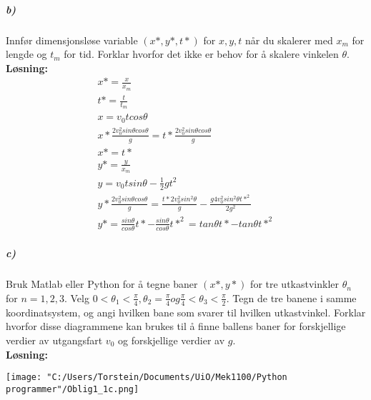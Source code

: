\documentclass[11pt, A4paper,norsk]{article}
\begin{document}
			\subparagraph{b)}
				\begin{flushleft}
Innfør dimensjonsløse variable $(x*, y* , t*)$ for $x, y, t$ når du skalerer med $x_m$ for lengde og $t_m$ for tid. Forklar hvorfor det ikke er behov for å skalere vinkelen $\theta$. \\
\vspace{1mm}
\textbf{Løsning:} \\
\vspace{1mm}
					\begin{align}
x* = \frac{x}{x_m} \nonumber \\
t* = \frac{t}{t_m} \nonumber \\
x = v_0 t cos\theta \nonumber \\
x* \frac{2 v_0^2 sin\theta cos\theta}{g} = t* \frac{2 v_0^2 sin\theta cos\theta}{g} \nonumber \\
x* = t* \nonumber \\
y* = \frac{y}{x_m} \nonumber\\
y = v_0 t sin\theta - \frac{1}{2} g t^2 \nonumber \\
y* \frac{2 v_0^2 sin\theta cos\theta}{g} = \frac{t* 2 v_0^2 sin^2\theta}{g} - \frac{g 4 v_0^2 sin^2\theta t*^2}{2 g^2} \nonumber \\
y* = \frac{sin\theta}{cos\theta} t* - \frac{sin\theta}{cos\theta}t*^2 = tan\theta t* - tan \theta t*^2 \nonumber
					\end{align}
				\end{flushleft}









			\subparagraph{c)}
				\begin{flushleft}
Bruk Matlab eller Python for å tegne baner $(x*, y*)$ for tre utkastvinkler $\theta_n$ for $n = 1, 2, 3$. Velg $0 < \theta_1 < \frac{\pi}{4}, \theta_2 = \frac{\pi}{4} og \frac{\pi}{4} < \theta_3 < \frac{\pi}{2}$. Tegn de tre banene i samme koordinatsystem, og angi hvilken bane som svarer til hvilken utkastvinkel. Forklar hvorfor disse diagrammene kan brukes til å finne ballens baner for forskjellige verdier av utgangsfart $v_0$ og forskjellige verdier av $g$. \\
\vspace{1mm}
\textbf{Løsning:} \\
\vspace{1mm}
				\end{flushleft}

\texttt{[image: "C:/Users/Torstein/Documents/UiO/Mek1100/Python programmer"/Oblig1\_1c.png]}
\end{document}
